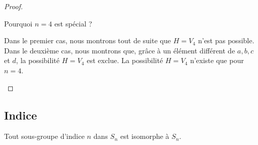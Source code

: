 \begin{proof}
\begin{subproof}
\begin{subproof}
			\item[Pourquoi \( n=4\) est spécial ?]

			Dans le premier cas, nous montrons tout de suite que \( H=V_4\) n'est pas possible. Dans le deuxième cas, nous montrons que, grâce à un élément différent de \( a,b,c\) et \( d\), la possibilité \( H=V_4\) est exclue. La possibilité \( H=V_4\) n'existe que pour \( n=4\).

		\end{subproof}
	\end{subproof}

\end{proof}

\subsection{Indice}

\begin{theorem}
	Tout sous-groupe d'indice \( n\) dans \( S_n\) est isomorphe à \( S_n\).
\end{theorem}

